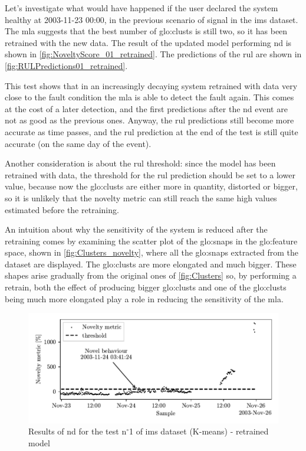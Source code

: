 Let's investigate what would have happened if the user declared the system healthy at 2003-11-23 00:00, in the previous scenario of   signal in the \gls{ims} dataset. The \gls{mla} suggests that the best number of \gls{glo:clust}s is still two, so it has been retrained with the new data. The result of the updated model performing \gls{nd} is shown in \autoref{fig:NoveltyScore_01_retrained}. The predictions of the \gls{rul} are shown in \autoref{fig:RULPredictions01_retrained}. 

This test shows that in an increasingly decaying system retrained with data very close to the fault condition the \gls{mla} is able to detect the fault again. This comes at the cost of a later detection, and the first predictions after the \gls{nd} event are not as good as the previous ones. Anyway, the \gls{rul} predictions still become more accurate as time passes, and the \gls{rul} prediction at the end of the test is still quite accurate (on the same day of the event). 

Another consideration is about the \gls{rul} threshold: since the model has been retrained with  data, the threshold for the \gls{rul} prediction should be set to a lower value, because now the \gls{glo:clust}s are either more in quantity, distorted or bigger, so it is unlikely that the novelty metric can still reach the same high values estimated before the retraining.

An intuition about why the sensitivity of the system is reduced after the retraining comes by examining the scatter plot of the \gls{glo:snap}s in the \gls{glo:feature} space, shown in \autoref{fig:Clusters_novelty}, where all the \gls{glo:snap}s extracted from the dataset are displayed. The \gls{glo:clust}s are more elongated and much bigger. These shapes arise gradually from the original ones of \autoref{fig:Clusters} so, by performing a retrain, both the effect of producing bigger \gls{glo:clust}s and one of the \gls{glo:clust}s being much more elongated play a role in reducing the sensitivity of the \gls{mla}.

\begin{figure}
    \centering
    \includegraphics{images/IMS/Novelty_01_500samples_bearing3x_retrained.pdf}
    \caption{Results of \gls{nd} for the test $\text{n}^\circ$1 of \gls{ims} dataset (K-means) - retrained model}
    \label{fig:NoveltyScore_01_retrained}
\end{figure}

